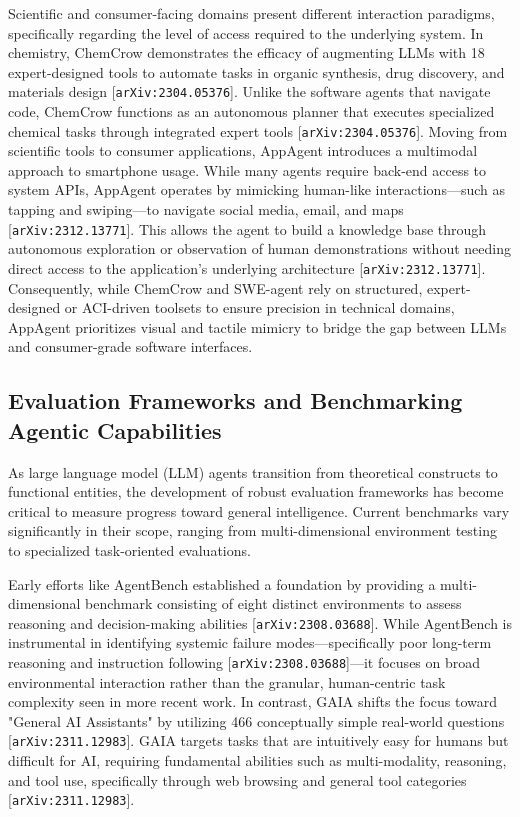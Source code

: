\documentclass[11pt]{article}
\begin{document}
Scientific and consumer-facing domains present different interaction paradigms, specifically regarding the level of access required to the underlying system. In chemistry, ChemCrow demonstrates the efficacy of augmenting LLMs with 18 expert-designed tools to automate tasks in organic synthesis, drug discovery, and materials design [\texttt{arXiv:2304.05376}]. Unlike the software agents that navigate code, ChemCrow functions as an autonomous planner that executes specialized chemical tasks through integrated expert tools [\texttt{arXiv:2304.05376}]. Moving from scientific tools to consumer applications, AppAgent introduces a multimodal approach to smartphone usage. While many agents require back-end access to system APIs, AppAgent operates by mimicking human-like interactions—such as tapping and swiping—to navigate social media, email, and maps [\texttt{arXiv:2312.13771}]. This allows the agent to build a knowledge base through autonomous exploration or observation of human demonstrations without needing direct access to the application's underlying architecture [\texttt{arXiv:2312.13771}]. Consequently, while ChemCrow and SWE-agent rely on structured, expert-designed or ACI-driven toolsets to ensure precision in technical domains, AppAgent prioritizes visual and tactile mimicry to bridge the gap between LLMs and consumer-grade software interfaces.

\subsection{Evaluation Frameworks and Benchmarking Agentic Capabilities}

As large language model (LLM) agents transition from theoretical constructs to functional entities, the development of robust evaluation frameworks has become critical to measure progress toward general intelligence. Current benchmarks vary significantly in their scope, ranging from multi-dimensional environment testing to specialized task-oriented evaluations.

Early efforts like AgentBench established a foundation by providing a multi-dimensional benchmark consisting of eight distinct environments to assess reasoning and decision-making abilities [\texttt{arXiv:2308.03688}]. While AgentBench is instrumental in identifying systemic failure modes—specifically poor long-term reasoning and instruction following [\texttt{arXiv:2308.03688}]—it focuses on broad environmental interaction rather than the granular, human-centric task complexity seen in more recent work. In contrast, GAIA shifts the focus toward "General AI Assistants" by utilizing 466 conceptually simple real-world questions [\texttt{arXiv:2311.12983}]. GAIA targets tasks that are intuitively easy for humans but difficult for AI, requiring fundamental abilities such as multi-modality, reasoning, and tool use, specifically through web browsing and general tool categories [\texttt{arXiv:2311.12983}].
\end{document}
